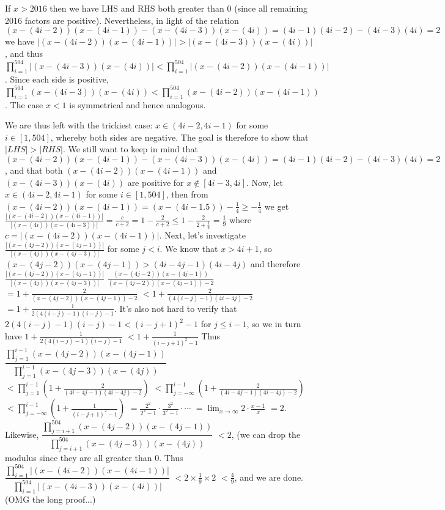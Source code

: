 \documentclass[11pt,a4paper]{article}
\begin{document}
\begin{itemize}
If $x>2016$ then we have LHS and RHS both greater than 0 (since all remaining 2016 factors are positive). 
Nevertheless, in light of the relation 
$(x-(4i-2))(x-(4i-1))-(x-(4i-3))(x-(4i))=(4i-1)(4i-2)-(4i-3)(4i)=2$ we have 
$|(x-(4i-2))(x-(4i-1))|>|(x-(4i-3))(x-(4i))|$, and thus 
$\displaystyle\prod_{i=1}^{504} |(x-(4i-3))(x-(4i))|<\displaystyle\prod_{i=1}^{504} |(x-(4i-2))(x-(4i-1))|$. 
Since each side is positive, $\displaystyle\prod_{i=1}^{504} (x-(4i-3))(x-(4i))<\displaystyle\prod_{i=1}^{504} (x-(4i-2))(x-(4i-1))$. 
The case $x<1$ is symmetrical and hence analogous. 

We are thus left with the trickiest case: $x\in (4i-2, 4i-1)$ for some $i\in [1, 504]$, whereby both sides are negative. 
The goal is therefore to show that $|LHS|>|RHS|$.  
We still want to keep in mind that $(x-(4i-2))(x-(4i-1))-(x-(4i-3))(x-(4i))=(4i-1)(4i-2)-(4i-3)(4i)=2$, 
and that both $(x-(4i-2))(x-(4i-1))$ and $(x-(4i-3))(x-(4i))$ are positive for $x\not\in [4i-3, 4i]$. 
Now, let $x\in (4i-2, 4i-1)$ for some $i\in [1, 504]$, 
then from $(x-(4i-2))(x-(4i-1))=(x-(4i-1.5))-\frac 14\ge -\frac 14$ we get 
$\frac{|(x-(4i-2))(x-(4i-1))|}{|(x-(4i))(x-(4i-3))|}=\frac{c}{c+2}=1-\frac{2}{c+2}\le 1-\frac 2{2+\frac 14}=\frac 19$ where $c=|(x-(4i-2))(x-(4i-1))|$. 
Next, let's investigate $\frac{|(x-(4j-2))(x-(4j-1))|}{|(x-(4j))(x-(4j-3))|}$ 
for some $j<i$. 
We know that $x>4i+1$, so 
$(x-(4j-2))(x-(4j-1))> (4i-4j-1)(4i-4j)$ 
and therefore 
$\frac{|(x-(4j-2))(x-(4j-1))|}{|(x-(4j))(x-(4j-3))|}$
$\frac{(x-(4j-2))(x-(4j-1))}{(x-(4j-2))(x-(4j-1))-2}$
$=1+\frac 2{(x-(4j-2))(x-(4j-1))-2}$
$<1+\frac 2{(4(i-j)-1)(4i-4j)-2}$
$=1+\frac 1{2(4(i-j)-1)(i-j)-1}$. 
It's also not hard to verify that $2(4(i-j)-1)(i-j)-1<(i-j+1)^2-1$ for $j\le i-1$, so we in turn have 
$ 1+\frac 1{2(4(i-j)-1)(i-j)-1}$
$<1+\frac 1{(i-j+1)^2-1}$
Thus $\dfrac{\displaystyle\prod_{j=1}^{i-1} (x-(4j-2))(x-(4j-1))}{\displaystyle\prod_{j=1}^{i-1} (x-(4j-3))(x-(4j))}$
$<\displaystyle\prod_{j=1}^{i-1}(1+\frac 2{(4i-4j-1)(4i-4j)-2})$
$<\displaystyle\prod_{j=-\infty}^{i-1}(1+\frac 2{(4i-4j-1)(4i-4j)-2})$
$<\displaystyle\prod_{j=-\infty}^{i-1}(1+\frac 1{(i-j+1)^2-1})$
$=\frac{2^2}{2^2-1}\cdot\frac{3^2}{3^2-1}\cdot\cdots$
$=\lim_{x\to\infty}2\cdot \frac{x-1}{x}$
$=2$. 
Likewise, $\dfrac{\displaystyle\prod_{j=i+1}^{504} (x-(4j-2))(x-(4j-1))}{\displaystyle\prod_{j=i+1}^{504} (x-(4j-3))(x-(4j))}$
$<2$, 
(we can drop the modulus since they are all greater than 0. 
Thus $\dfrac{\displaystyle\prod_{i=1}^{504} |(x-(4i-2))(x-(4i-1))|}{\displaystyle\prod_{i=1}^{504} |(x-(4i-3))(x-(4i))|}$
$<2\times \frac{1}{9}\times 2$
$<\frac 49$, 
and we are done. (OMG the long proof...)

\end{itemize}
\end{document}
